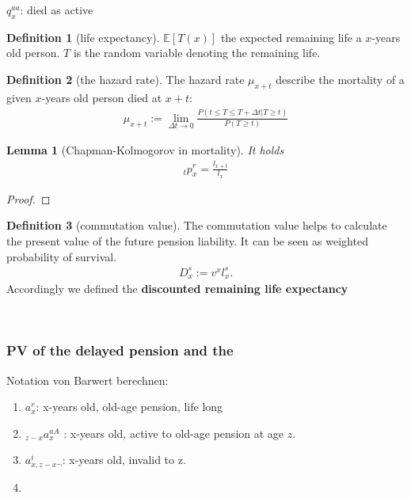 \documentclass[a4paper,11pt]{book}
\newtheorem{lemma}[theorem]{Lemma}
\theoremstyle{definition}
\newtheorem{definition}{Definition}[section]
\theoremstyle{remark}
\begin{document}
$q^{aa}_x$: died as active

\begin{definition}[life expectancy]
	$\mathbb{E}[T(x)]$ the expected remaining life a $x$-years old person. $T$ is the random variable denoting the remaining life. 
\end{definition}

\begin{definition}[the hazard rate]
	The hazard rate $\mu_{x + t}$ describe the mortality of a given $x$-years old person died at $x + t$:
	\begin{align*}
		\mu_{x + t}:= \lim_{\Delta t \rightarrow 0} \frac{P(t \le T \le T + \Delta t|T \ge t) }{P(T \ge t) }
	\end{align*}
\end{definition}

\begin{lemma}[Chapman-Kolmogorov in mortality]
It holds
\begin{align*}
	{}_tp_x^r = \frac{l_{x + t}}{l_x}
\end{align*}
\end{lemma}
\begin{proof}
\end{proof}

\begin{definition}[commutation value]
The commutation value helps to calculate the present value of the future pension liability. It can be seen as weighted probability of survival.
\begin{align*}
	D_x^s := v^x l_x^s.
\end{align*}
Accordingly we defined the \textbf{discounted remaining life expectancy}
\end{definition}


\quad\\

\subsubsection{PV of the delayed pension and the  }
Notation von Barwert berechnen: 

\begin{enumerate}
	\item $a_x^r$: x-years old, old-age pension, life long
	\item ${}_{z - x} a_x^{a A}$ : x-years old, active to old-age pension at age $z$.   
	\item $ a_{x, z - x\neg}^i$: x-years old, invalid to z. 
	\item 
\end{enumerate}
\end{document}
